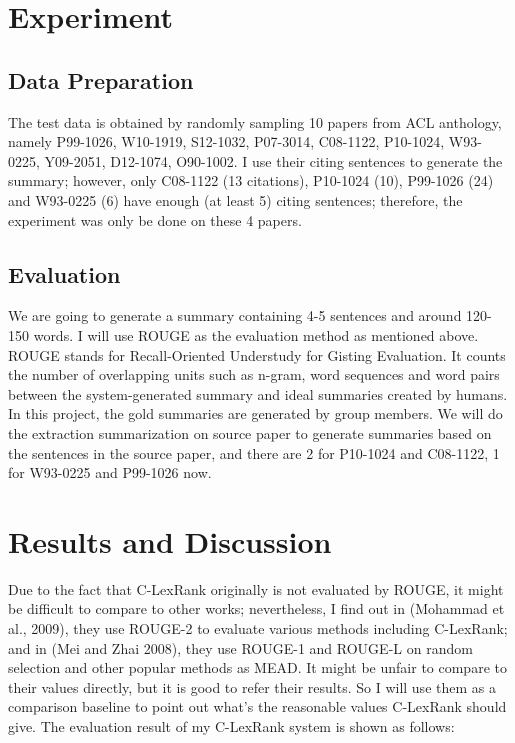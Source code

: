 \documentclass[hyp]{socreport}
\begin{document}
\section{Experiment}

\subsection{Data Preparation}
  The test data is obtained by randomly sampling 10 papers from ACL anthology, namely P99-1026, W10-1919, S12-1032, P07-3014, C08-1122,
P10-1024, W93-0225, Y09-2051, D12-1074, O90-1002. I use their citing sentences to generate the summary; however, only 
C08-1122 (13 citations), P10-1024 (10), P99-1026 (24) and W93-0225 (6) have enough (at least 5) citing sentences; therefore, the experiment was only be done on these 4 papers.

\subsection{Evaluation}
  We are going to generate a summary containing 4-5 sentences and around 120-150 words. 
I will use ROUGE as the evaluation method as mentioned above. ROUGE stands for Recall-Oriented Understudy for Gisting Evaluation.
It counts the number of overlapping units such 
as n-gram, word sequences and word pairs between the system-generated summary and ideal summaries created by humans.
In this project, 
the gold summaries are generated by group members. We will do the extraction summarization on source paper to generate summaries 
based on the sentences in the source paper, and there are 2 for P10-1024 and C08-1122, 1 for W93-0225 and P99-1026 now.

\section{Results and Discussion}

  Due to the fact that C-LexRank originally is not evaluated by ROUGE, it might be difficult to compare to other works; 
nevertheless, I find out in (Mohammad et al., 2009), they use ROUGE-2 to evaluate various methods including C-LexRank; 
and in (Mei and Zhai 2008), they use ROUGE-1 and ROUGE-L on random selection and other popular methods as MEAD. It might 
be unfair to compare to their values directly, but it is good to refer their results. So I will use them as a comparison 
baseline to point out what's the reasonable values C-LexRank should give. The evaluation result of my C-LexRank system is 
shown as follows:
\end{document}
